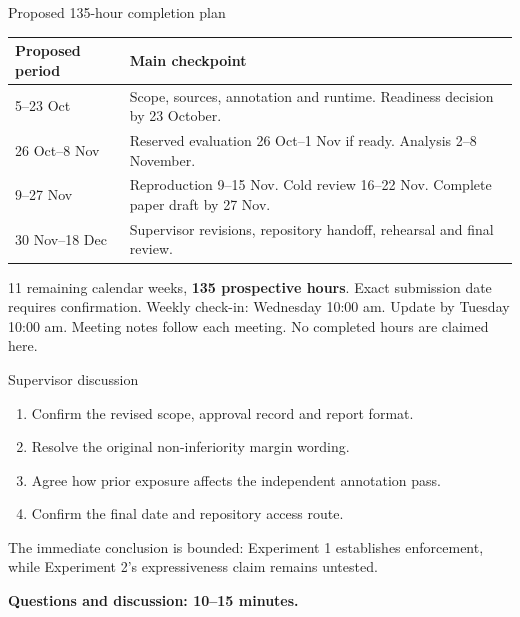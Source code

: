 \documentclass[10pt]{beamer}
\newcommand{\toprule}{\hline}
\newcommand{\midrule}{\hline}
\newcommand{\bottomrule}{\hline}
\newcommand{\src}[1]{\vfill{\tiny\color{bcitgray}#1}}
\begin{document}
\begin{frame}{Proposed 135-hour completion plan}
\small
\begin{tabular}{@{}P{2.2cm}P{7.7cm}@{}}
\toprule
Proposed period & Main checkpoint\\\midrule
5--23 Oct & Scope, sources, annotation and runtime. Readiness decision by 23 October.\\[0.18cm]
26 Oct--8 Nov & Reserved evaluation 26 Oct--1 Nov if ready. Analysis 2--8 November.\\[0.18cm]
9--27 Nov & Reproduction 9--15 Nov. Cold review 16--22 Nov. Complete paper draft by 27 Nov.\\[0.18cm]
30 Nov--18 Dec & Supervisor revisions, repository handoff, rehearsal and final review.\\\bottomrule
\end{tabular}\par
\vspace{0.25cm}
11 remaining calendar weeks, \textbf{135 prospective hours}. Exact submission date requires confirmation.
\src{Weekly check-in: Wednesday 10:00 am. Update by Tuesday 10:00 am. Meeting notes follow each meeting. No completed hours are claimed here.}
\end{frame}

\begin{frame}{Supervisor discussion}
\begin{enumerate}
\item Confirm the revised scope, approval record and report format.
\item Resolve the original non-inferiority margin wording.
\item Agree how prior exposure affects the independent annotation pass.
\item Confirm the final date and repository access route.
\end{enumerate}
\vspace{0.5cm}
The immediate conclusion is bounded: Experiment 1 establishes enforcement, while Experiment 2's expressiveness claim remains untested.\par
\vspace{0.3cm}
\textbf{Questions and discussion: 10--15 minutes.}
\end{frame}
\end{document}
